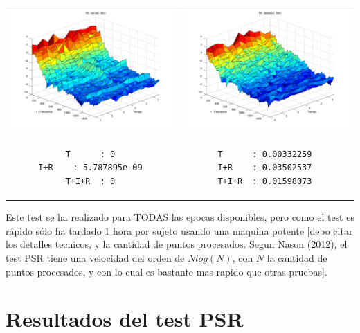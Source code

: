 \begin{tabular}{cc}
\includegraphics[width=0.5\linewidth]{n8f.pdf} 
&
\includegraphics[width=0.5\linewidth]{d8f.pdf} 
\\
\begin{lstlisting}
T      : 0 
I+R    : 5.787895e-09 
T+I+R  : 0 
\end{lstlisting}
&
\begin{lstlisting}
T      : 0.00332259 
I+R    : 0.03502537 
T+I+R  : 0.01598073 
\end{lstlisting}
\end{tabular}

Este test se ha realizado para TODAS las epocas disponibles, pero como el test
es r\'apido s\'olo ha tardado 1 hora por sujeto usando una maquina potente [debo citar
los detalles tecnicos, y la cantidad de puntos procesados. Segun Nason (2012), el test PSR
tiene una velocidad del orden de $N log(N)$, con $N$ la cantidad de puntos procesados, y 
con lo cual es bastante mas rapido que otras pruebas].


\section{Resultados del test PSR}



